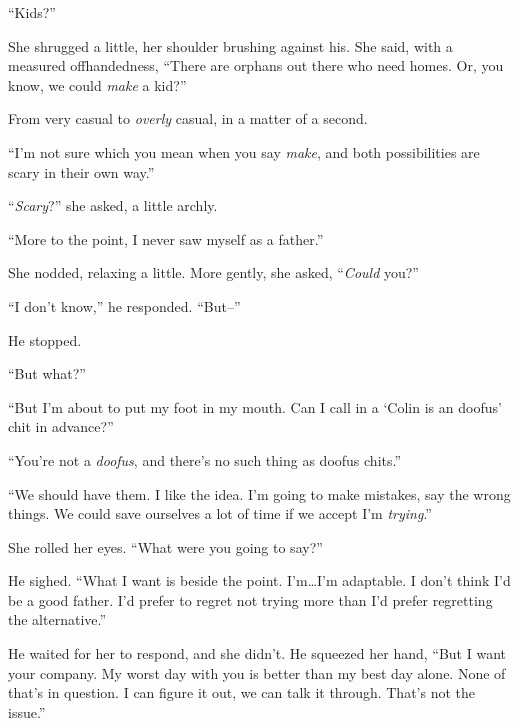``Kids?''



She shrugged a little, her shoulder brushing against his.  She said, with a measured offhandedness, ``There are orphans out there who need homes.  Or, you know, we could \emph{make} a kid?''



From very casual to \emph{overly} casual, in a matter of a second.



``I'm not sure which you mean when you say \emph{make}, and both possibilities are scary in their own way.''



``\emph{Scary}?'' she asked, a little archly.



``More to the point, I never saw myself as a father.''



She nodded, relaxing a little.  More gently, she asked, ``\emph{Could} you?''



``I don't know,'' he responded.  ``But--''



He stopped.



``But what?''



``But I'm about to put my foot in my mouth.  Can I call in a `Colin is an doofus' chit in advance?''



``You're not a \emph{doofus}, and there's no such thing as doofus chits.''



``We should have them.  I like the idea.  I'm going to make mistakes, say the wrong things.  We could save ourselves a lot of time if we accept I'm \emph{trying}.''



She rolled her eyes.  ``What were you going to say?''



He sighed.  ``What I want is beside the point.  I'm\ldots I'm adaptable.  I don't think I'd be a good father.  I'd prefer to regret not trying more than I'd prefer regretting the alternative.''



He waited for her to respond, and she didn't.  He squeezed her hand, ``But I want your company.  My worst day with you is better than my best day alone.  None of that's in question.  I can figure it out, we can talk it through.  That's not the issue.''



